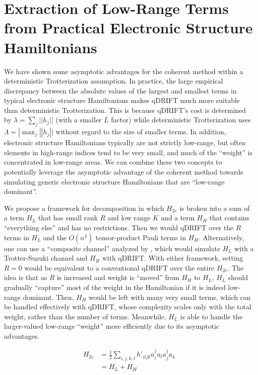 \section{Extraction of Low-Range Terms from Practical Electronic Structure Hamiltonians}

We have shown some asymptotic advantages for the coherent method within a deterministic Trotterization assumption. In practice, the large empirical discrepancy between the absolute values of the largest and smallest terms in typical electronic structure Hamiltonians makes qDRIFT much more suitable than deterministic Trotterization. This is because qDRIFT's cost is determined by $\lambda = \sum_j ||h_j||$ (with a smaller $L$ factor) while deterministic Trotterization uses $\Lambda = |\max_j ||h_j||$ without regard to the size of smaller terms. In addition, electronic structure Hamiltonians typically are not strictly low-range, but often elements in high-range indices tend to be very small, and much of the ``weight'' is concentrated in low-range areas. We can combine these two concepts to potentially leverage the asymptotic advantage of the coherent method towards simulating generic electronic structure Hamiltonians that are ``low-range dominant''.

We propose a framework for decomposition in which $H_{2e}$ is broken into a sum of a term $H_L$ that has small rank $R$ and low range $K$ and a term $H_H$ that contains ``everything else'' and has no restrictions. Then we would qDRIFT over the $R$ terms in $H_L$ and the $O(n^4)$ tensor-product Pauli terms in $H_H$. Alternatively, one can use a ``composite channel'' analyzed by \cite{CompositeQDRIFT}, which would simulate $H_L$ with a Trotter-Suzuki channel and $H_H$ with qDRIFT.
With either framework, setting $R = 0$ would be equivalent to a conventional qDRIFT over the entire $H_{2e}$. The idea is that as $R$ is increased and weight is ``moved'' from $H_H$ to $H_L$, $H_L$ should gradually ``capture'' most of the weight in the Hamiltonian if it is indeed low-range dominant. Then, $H_H$ would be left with many very small terms, which can be handled effectively with qDRIFT, whose complexity scales only with the total weight, rather than the number of terms. Meanwhile, $H_L$ is able to handle the larger-valued low-range ``weight'' more efficiently due to its asymptotic advantages.

\begin{equation}
    \begin{split}
        H_{2e} &= \frac{1}{2}\sum_{i,j,k,l} h'_{iljk}a^\dag_ia_la^\dag_ja_k \\
        &= H_L + H_H
    \end{split}
\end{equation}

